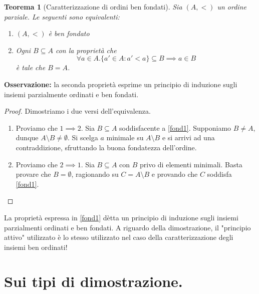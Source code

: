 \documentclass[fontsize = 11 pt, paper=A4, oneside, index=totoc, hyperref]{article}
\theoremstyle{definition}
\theoremstyle{plain}
\newtheorem{thm}{Teorema}[section]
\begin{document}
\begin{thm}[Caratterizzazione di ordini ben fondati]
  Sia \((A,<)\) un ordine parziale. Le seguenti sono equivalenti:
  \begin{enumerate}
    \item \((A,<)\) è ben fondato
    \item Ogni \(B \subseteq A\) con la proprietà che
    \[
    \forall a \in A. \lbrace a' \in A \colon a' < a \rbrace \subseteq B \implies a \in B \label{fond1}
    \]
    è tale che \(B = A\).
  \end{enumerate}
\end{thm}
{\bf Osservazione:} la seconda proprietà esprime un principio di induzione sugli insiemi parzialmente ordinati e ben fondati.
\begin{proof} Dimostriamo i due versi dell'equivalenza.
  \begin{enumerate}
    \item Proviamo che \(1 \implies 2\). Sia \(B \subseteq A\) soddisfacente a \eqref{fond1}. Supponiamo \(B \neq A\), dunque \(A \setminus B \neq \emptyset\). Si scelga \(a\) minimale su \(A \setminus B\) e si arrivi ad una contraddizione, sfruttando la buona fondatezza dell'ordine.
    \item Proviamo che \(2 \implies 1\). Sia \(B \subseteq A\) con \(B\) privo di elementi minimali. Basta provare che \(B = \emptyset\), ragionando su \(C = A \setminus B\) e provando che \(C\) soddisfa \eqref{fond1}. \qedhere
  \end{enumerate}
\end{proof}
La proprietà espressa in \eqref{fond1} dètta un principio di induzione sugli insiemi parzialmenti ordinati e ben fondati. A riguardo della dimostrazione, il "principio attivo" utilizzato è lo stesso utilizzato nel caso della caratterizzazione degli insiemi ben ordinati!

\section{Sui tipi di dimostrazione.}
\end{document}
